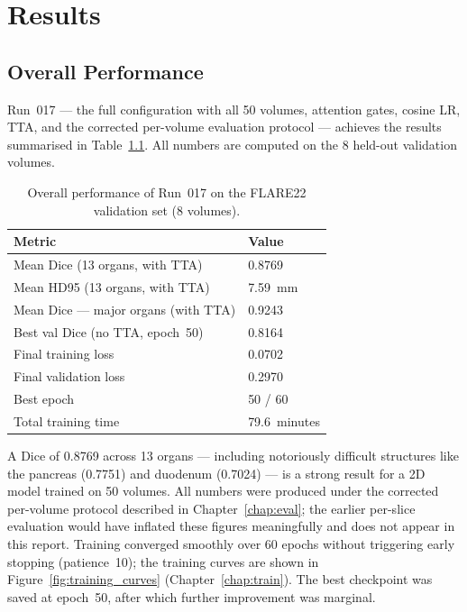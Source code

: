 \chapter{Results}
\label{chap:results}

\section{Overall Performance}

Run~017 --- the full configuration with all 50 volumes, attention gates, cosine LR,
TTA, and the corrected per-volume evaluation protocol --- achieves the results
summarised in Table~\ref{tab:overall_results}. All numbers are computed on the 8
held-out validation volumes.

\begin{table}[h!]
\centering
\caption{Overall performance of Run~017 on the FLARE22 validation set (8 volumes).}
\label{tab:overall_results}
\begin{tabular}{ll}
\toprule
\textbf{Metric} & \textbf{Value} \\
\midrule
Mean Dice (13 organs, with TTA)       & 0.8769 \\
Mean HD95 (13 organs, with TTA)       & 7.59~mm \\
Mean Dice --- major organs (with TTA) & 0.9243 \\
Best val Dice (no TTA, epoch~50)      & 0.8164 \\
Final training loss                   & 0.0702 \\
Final validation loss                 & 0.2970 \\
Best epoch                            & 50 / 60 \\
Total training time                   & 79.6~minutes \\
\bottomrule
\end{tabular}
\end{table}

A Dice of 0.8769 across 13 organs --- including notoriously difficult structures like the
pancreas (0.7751) and duodenum (0.7024) --- is a strong result for a 2D model trained on 50
volumes. All numbers were produced under the corrected per-volume protocol described in
Chapter~\ref{chap:eval}; the earlier per-slice evaluation would have inflated these figures
meaningfully and does not appear in this report. Training converged smoothly over 60 epochs
without triggering early stopping (patience~10); the training curves are shown in
Figure~\ref{fig:training_curves} (Chapter~\ref{chap:train}). The best checkpoint was saved at
epoch~50, after which further improvement was marginal.

